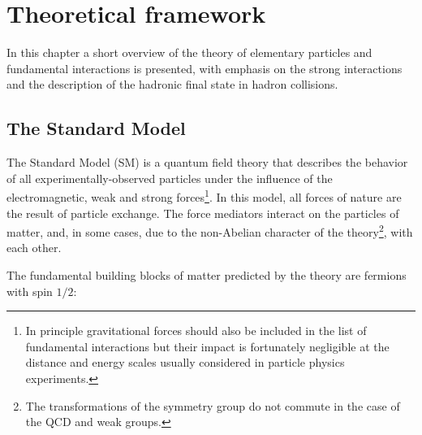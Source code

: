 %
%
\chapter{Theoretical framework}\label{ch:theory}

In this chapter a short overview of the theory of elementary particles and fundamental interactions is presented, with emphasis on the strong interactions and the description of the hadronic final state in hadron collisions.

\section{The Standard Model}\label{sec:qcdintro}

The Standard Model (SM) is a quantum field theory that describes the behavior of all experimentally-observed particles under the influence of the electromagnetic, weak and strong forces\footnote{In principle gravitational forces should also be included in the list of fundamental interactions but their impact is  fortunately negligible at the distance and energy scales usually considered in particle physics experiments.}. In this model, all forces of nature are the result of particle exchange. The force mediators interact on the particles of matter, and, in some cases, due to the non-Abelian character of the theory\footnote{The transformations of the symmetry group do not commute in the case of the QCD and weak groups.}, with each other.

The fundamental building blocks of matter predicted by the theory are fermions with spin $1/2$:

